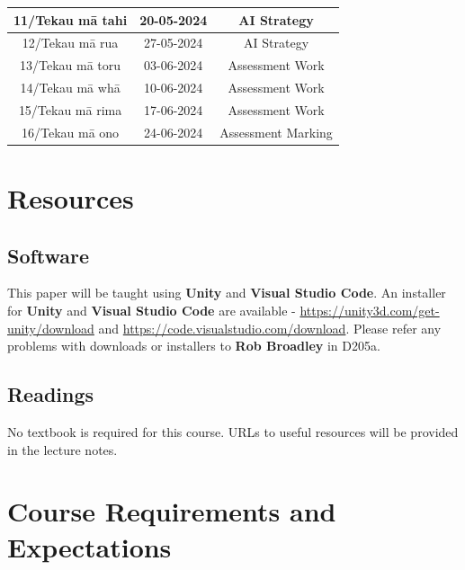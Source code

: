 \documentclass{article}
\begin{document}
\begin{tabular}{|c|c|c|c|}
	\footnotesize 11/Tekau mā tahi & \footnotesize 20-05-2024 & \multicolumn{2}{c|}{\footnotesize AI Strategy}                                                                 \\ \hline
	\footnotesize 12/Tekau mā rua  & \footnotesize 27-05-2024 & \multicolumn{2}{c|}{\footnotesize AI Strategy}                                                                 \\ \hline
	\footnotesize 13/Tekau mā toru & \footnotesize 03-06-2024 & \multicolumn{2}{c|}{\footnotesize Assessment Work}                                                     \\ \hline
	\footnotesize 14/Tekau mā whā  & \footnotesize 10-06-2024 & \multicolumn{2}{c|}{\footnotesize Assessment Work} \\ \hline 
	\footnotesize 15/Tekau mā rima & \footnotesize 17-06-2024 & \multicolumn{2}{c|}{\footnotesize Assessment Work}                                                       \\ \hline
	\footnotesize 16/Tekau mā ono  & \footnotesize 24-06-2024 & \multicolumn{2}{c|}{\footnotesize Assessment Marking}                                                         \\ \hline
\end{tabular} 

\section*{Resources}

\subsection*{Software}
This paper will be taught using \textbf{Unity} and \textbf{Visual Studio Code}. An installer for \textbf{Unity} and \textbf{Visual Studio Code} are available - \href{https://unity3d.com/get-unity/download}{https://unity3d.com/get-unity/download} and \href{https://code.visualstudio.com/download}{https://code.visualstudio.com/download}. Please refer any problems with downloads or installers to \textbf{Rob Broadley} in D205a.

\subsection*{Readings}
No textbook is required for this course. URLs to useful resources will be provided in the lecture notes. 

\section*{Course Requirements and Expectations}
\end{document}
